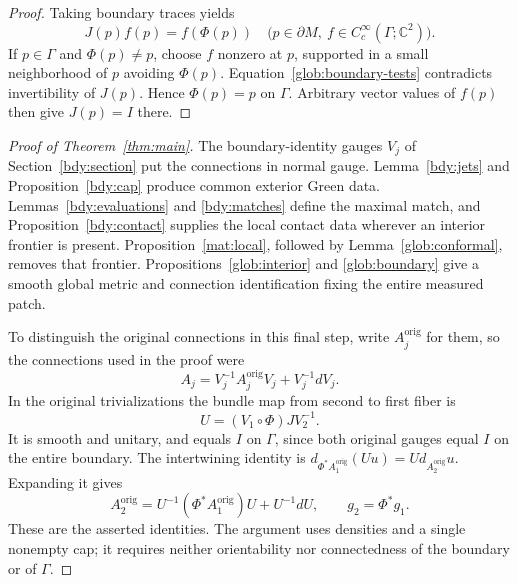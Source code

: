 \begin{proof}
Taking boundary traces yields
\begin{equation}\label{glob:boundary-tests}
             J(p)f(p)=f(\Phi(p))
 \quad\bigl(p\in\partial M,\ f\in C_c^\infty(\Gamma;\mathbb C^2)\bigr).
\end{equation}
If \(p\in\Gamma\) and \(\Phi(p)\ne p\), choose \(f\) nonzero
at \(p\), supported in a small neighborhood of \(p\) avoiding
\(\Phi(p)\).  Equation~\eqref{glob:boundary-tests} contradicts
invertibility of \(J(p)\).  Hence \(\Phi(p)=p\) on \(\Gamma\).
Arbitrary vector values of \(f(p)\) then give \(J(p)=I\) there.
\end{proof}

\begin{proof}[Proof of Theorem~\ref{thm:main}]
The boundary-identity gauges \(V_j\) of
Section~\ref{bdy:section} put the connections in normal gauge.
Lemma~\ref{bdy:jets} and Proposition~\ref{bdy:cap} produce common
exterior Green data.  Lemmas~\ref{bdy:evaluations} and
\ref{bdy:matches} define the maximal match, and
Proposition~\ref{bdy:contact} supplies the local contact data
wherever an interior frontier is present.  Proposition~\ref{mat:local}, followed by Lemma~\ref{glob:conformal}, removes
that frontier.  Propositions~\ref{glob:interior} and
\ref{glob:boundary} give a smooth global metric and connection
identification fixing the entire measured patch.

To distinguish the original connections in this final step, write
\(A_j^{\mathrm{orig}}\) for them, so the connections used in the
proof were
\[
 A_j=V_j^{-1}A_j^{\mathrm{orig}}V_j+V_j^{-1}dV_j.
\]
In the original trivializations the bundle map from second to
first fiber is
\[
                         U=(V_1\circ\Phi)J V_2^{-1}.
\]
It is smooth and unitary, and equals \(I\) on \(\Gamma\), since
both original gauges equal \(I\) on the entire boundary.
The intertwining identity is
\(d_{\Phi^*A_1^{\mathrm{orig}}}(Uu)=U d_{A_2^{\mathrm{orig}}}u\).
Expanding it gives
\[
 A_2^{\mathrm{orig}}
    =U^{-1}(\Phi^*A_1^{\mathrm{orig}})U+U^{-1}dU,
 \qquad g_2=\Phi^*g_1.
\]
These are the asserted identities.  The argument uses densities
and a single nonempty cap; it requires neither orientability nor
connectedness of the boundary or of \(\Gamma\).
\end{proof}
